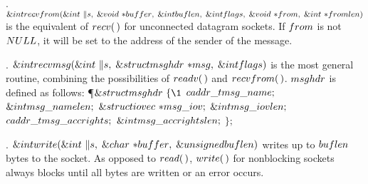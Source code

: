 \fi

. \CD{}$\&{int}\ \\{recvfrom}(\&{int}\ \|s,\;\&{void}\ {*}\\{buffer},\;%
\&{int}\ \\{buflen},\;\&{int}\ \\{flags},\;\&{void}\ {*}\\{from},\;\&{int}\ {*}%
\\{fromlen})$\DC{}
is the equivalent of \CD{}$\\{recv}(\,)$\DC{} for unconnected datagram sockets.
If \CD{}$\\{from}$\DC{} is not
\CD{}$\\{NULL}$\DC{}, it will be set to the address of the sender of the
message.

\fi

. \CD{}$\&{int}\ \\{recvmsg}(\&{int}\ \|s,\;\&{struct}\ \\{msghdr}\ {*}%
\\{msg},\;\&{int}\ \\{flags})$\DC{} is the most general routine,
combining the possibilities of \CD{}$\\{readv}(\,)$\DC{} and \CD{}$%
\\{recvfrom}(\,)$\DC{}. \CD{}$\\{msghdr}$\DC{} is defined as
follows:
\Y\P $\&{struct}\ \\{msghdr}\ \{\1$\6
$\\{caddr\_t}\ \\{msg\_name};$\5
\6
$\&{int}\ \\{msg\_namelen};$\5
\6
$\&{struct}\ \\{iovec}\ {{*}}\\{msg\_iov};$\5
\6
$\&{int}\ \\{msg\_iovlen};$\5
\6
$\\{caddr\_t}\ \\{msg\_accrights};$\5
\6
$\&{int}\ \\{msg\_accrightslen};$\2\6
$\};$\par
\fi

. \CD{}$\&{int}\ \\{write}(\&{int}\ \|s,\;\&{char}\ {*}\\{buffer},\;%
\&{unsigned}\ \\{buflen})$\DC{} writes up to \CD{}$\\{buflen}$\DC{} bytes to
the socket. As opposed to \CD{}$\\{read}(\,)$\DC{}, \CD{}$\\{write}(\,)$\DC{}
for nonblocking sockets always blocks
until all bytes are written or an error occurs.

